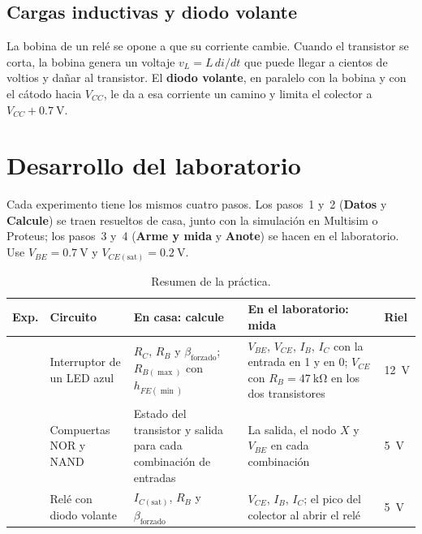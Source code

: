 \documentclass[11pt,a4paper]{article}
\let\needspace\Needspace
\begin{document}
\subsection{Cargas inductivas y diodo volante}
La bobina de un relé se opone a que su corriente cambie. Cuando el transistor se corta, la
bobina genera un voltaje $v_L = L\,di/dt$ que puede llegar a cientos de voltios y dañar al
transistor. El \textbf{diodo volante}, en paralelo con la bobina y con el cátodo hacia
$V_{CC}$, le da a esa corriente un camino y limita el colector a
$V_{CC} + \qty{0.7}{\volt}$.

\FloatBarrier
\needspace{14\baselineskip}
\section{Desarrollo del laboratorio}
Cada experimento tiene los mismos cuatro pasos. Los pasos~1 y~2 (\textbf{Datos} y
\textbf{Calcule}) se traen resueltos de casa, junto con la simulación en Multisim o Proteus;
los pasos~3 y~4 (\textbf{Arme y mida} y \textbf{Anote}) se hacen en el laboratorio. Use
$V_{BE} = \qty{0.7}{\volt}$ y $V_{CE(\text{sat})} = \qty{0.2}{\volt}$.

\begin{table}[H]
  \centering
  \renewcommand{\arraystretch}{1.35}
  \begin{tabularx}{\linewidth}{|>{\centering\arraybackslash}m{1.0cm}|>{\raggedright\arraybackslash}m{3.0cm}|>{\raggedright\arraybackslash}X|>{\raggedright\arraybackslash}X|>{\centering\arraybackslash}m{1.3cm}|}
    \hline
    \textbf{Exp.} & \textbf{Circuito} & \textbf{En casa: calcule} & \textbf{En el laboratorio: mida}
      & \textbf{Riel} \\ \hline
    1 & Interruptor de un LED azul
      & $R_C$, $R_B$ y $\beta_{\text{forzado}}$; $R_{B(\max)}$ con $h_{FE(\min)}$
      & $V_{BE}$, $V_{CE}$, $I_B$, $I_C$ con la entrada en 1 y en 0; $V_{CE}$ con
        $R_B = \qty{47}{\kilo\ohm}$ en los dos transistores
      & \qty{+12}{\volt} \\ \hline
    2 & Compuertas NOR y NAND
      & Estado del transistor y salida para cada combinación de entradas
      & La salida, el nodo $X$ y $V_{BE}$ en cada combinación
      & \qty{+5}{\volt} \\ \hline
    3 & Relé con diodo volante
      & $I_{C(\text{sat})}$, $R_B$ y $\beta_{\text{forzado}}$
      & $V_{CE}$, $I_B$, $I_C$; el pico del colector al abrir el relé
      & \qty{+5}{\volt} \\ \hline
  \end{tabularx}
  \caption{Resumen de la práctica.}
  \label{tab:resumen}
\end{table}
\end{document}
